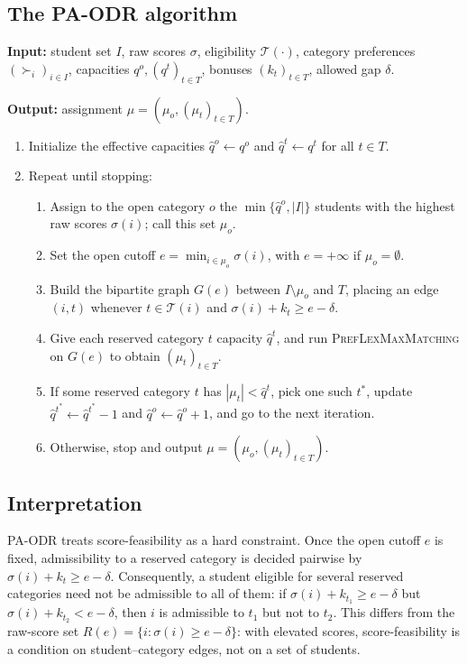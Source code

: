\documentclass[10pt]{article}
\newcommand{\T}{\mathcal{T}}
\newcommand{\1}{\mathbf{1}}
\begin{document}
\subsection{The PA-ODR algorithm}

\begin{algorithm}[H]
\caption{Preference-Aware Overlapping De-Reservation (PA-ODR)}
\label{alg:pa-odr}
\small
\textbf{Input:} student set $I$, raw scores $\sigma$, eligibility $\T(\cdot)$, category preferences $(\succ_i)_{i\in I}$, capacities $q^o,(q^t)_{t\in T}$, bonuses $(k_t)_{t\in T}$, allowed gap $\delta$.

\textbf{Output:} assignment $\mu=(\mu_o,(\mu_t)_{t\in T})$.
\begin{enumerate}
\item Initialize the effective capacities $\hat q^o\leftarrow q^o$ and $\hat q^t\leftarrow q^t$ for all $t\in T$.
\item Repeat until stopping:
\begin{enumerate}
\item Assign to the open category $o$ the $\min\{\hat q^o,|I|\}$ students with the highest raw scores $\sigma(i)$; call this set $\mu_o$.
\item Set the open cutoff $e=\min_{i\in\mu_o}\sigma(i)$, with $e=+\infty$ if $\mu_o=\emptyset$.
\item Build the bipartite graph $G(e)$ between $I\setminus\mu_o$ and $T$, placing an edge $(i,t)$ whenever $t\in\T(i)$ and $\sigma(i)+k_t\ge e-\delta$.
\item Give each reserved category $t$ capacity $\hat q^t$, and run \textsc{PrefLexMaxMatching} on $G(e)$ to obtain $(\mu_t)_{t\in T}$.
\item If some reserved category $t$ has $|\mu_t|<\hat q^t$, pick one such $t^\ast$, update $\hat q^{t^\ast}\leftarrow\hat q^{t^\ast}-1$ and $\hat q^o\leftarrow\hat q^o+1$, and go to the next iteration.
\item Otherwise, stop and output $\mu=(\mu_o,(\mu_t)_{t\in T})$.
\end{enumerate}
\end{enumerate}
\end{algorithm}

\subsection{Interpretation}

PA-ODR treats score-feasibility as a hard constraint. Once the open cutoff $e$ is fixed, admissibility to a reserved category is decided pairwise by $\sigma(i)+k_t\ge e-\delta$. Consequently, a student eligible for several reserved categories need not be admissible to all of them: if $\sigma(i)+k_{t_1}\ge e-\delta$ but $\sigma(i)+k_{t_2}<e-\delta$, then $i$ is admissible to $t_1$ but not to $t_2$. This differs from the raw-score set $R(e)=\{i:\sigma(i)\ge e-\delta\}$: with elevated scores, score-feasibility is a condition on student--category edges, not on a set of students.
\end{document}

